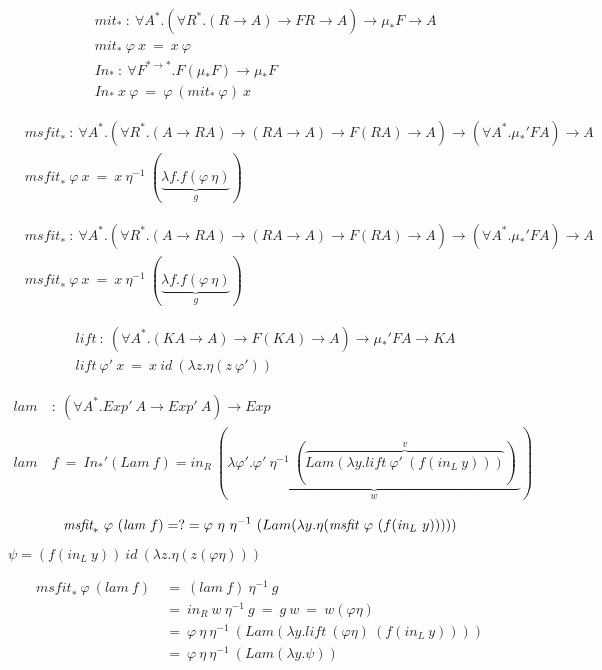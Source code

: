 \documentclass[a4paper,UKenglish]{lipics}
\newcommand{\MIt}[1]{\textit{mit}_{#1}}
\newcommand{\msfit}[1]{\ensuremath{\textit{msfit}_{#1}}}
\newcommand{\lift}[0]{\textit{lift}}
\newcommand{\In}[1]{\textit{In}_{#1}}
\newcommand{\inL}[0]{\textit{in}_{L}}
\newcommand{\inR}[0]{\textit{in}_{R}}
\begin{document}
\begin{align*}
&\MIt{*} ~:~ \forall A^{*}.
	(\forall R^{*}.(R \to A) \to F R \to A) \to \mu_{*} F \to A \\
&\MIt{*}~\varphi~x ~=~ x~\varphi \\
&\In{*} ~:~\forall F^{* \to *}.F(\mu_{*} F) \to \mu_{*} F \\
&\In{*}~x~\varphi ~=~ \varphi~(\MIt{*}~\varphi)~x
\end{align*}


\begin{align*}
&\msfit{*} ~:~ \forall A^{*}.
	(\forall R^{*}.(A \to R A) \to (R A \to A) \to F(R A) \to A) \to
	(\forall A^{*}.\mu_{*}' F A) \to A \\
&\msfit{*}~\varphi~x ~=~ x~\eta^{-1}~(\underbrace{\lambda f.f(\varphi~\eta)}_g)
\end{align*}

\begin{align*}
&\msfit{*} ~:~ \forall A^{*}.
	(\forall R^{*}.(A \to R A) \to (R A \to A) \to F(R A) \to A) \to
	(\forall A^{*}.\mu_{*}' F A) \to A \\
&\msfit{*}~\varphi~x ~=~ x~\eta^{-1}~(\underbrace{\lambda f.f(\varphi~\eta)}_g)
\end{align*}

\begin{align*}
& \lift~:~(\forall A^{*}.(K A\to A)\to F(K A)\to A)\to \mu_{*}' F A\to K A\\
& \lift~\varphi'~x ~=~ x~\textit{id}~(\lambda z.\eta(z~\varphi'))
\end{align*}




\begin{align*}
\textit{lam}&~:~(\forall A^{*}.\textit{Exp}'~A \to \textit{Exp}'~A) \to
		\textit{Exp} \\
\textit{lam}&~f~=~\In{*}'(\textit{Lam}~f)
= \inR~(\underbrace{
	\lambda \varphi'.\varphi'~\eta^{-1}~
	(\overbrace{\textit{Lam}(\lambda y.\textit{lift}~\varphi'~(f(\inL~y))) }^v)\;
	}_w)
\end{align*}

\[
\msfit{*}~\varphi~(\textit{lam}~f)
=?= \varphi~\eta~\eta^{-1}~(Lam(\lambda y.\eta(\msfit~\varphi~(f(\inL~y)))))
\]

$\psi = (f(\inL~y))~\textit{id}~(\lambda z.\eta(z(\varphi\eta)))$

\begin{align*}
\msfit{*}~\varphi~(\textit{lam}~f)
&~=~ (\textit{lam}~f)~\eta^{-1}~g \\
&~=~ \inR~w~\eta^{-1}~g ~=~ g~w ~=~ w(\varphi\eta) \\
&~=~ \varphi~\eta~\eta^{-1}~
	(\textit{Lam}(\lambda y.\lift~(\varphi\eta)~(f(\inL~y)))) \\
&~=~ \varphi~\eta~\eta^{-1}~(\textit{Lam}(\lambda y.\psi))
\end{align*}
\end{document}
